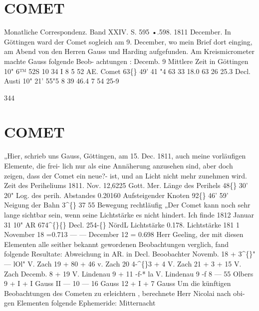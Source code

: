 \documentclass[12pt,a4paper]{article}
\newcommand{\degree}{\textdegree}
\begin{document}
\section*{COMET}
Monatliche  Correspondenz.     Band  XXIV.  S.  595  •.598.     1811  December. 
In  Göttingen  ward  der  Comet  sogleich  am  9.  December,  wo  mein  Brief  dort  einging,  am  Abend 
von  den  Herren  Gauss  und  Harding  aufgefunden.  Am  Kreismicrometer  machte  Gauss  folgende  Beob- 
achtungen : 
Decemb.   9 
Mittlere  Zeit 
in  Göttingen 
10"    6™  52S 
10    34      I 
8      5     52 
AE.  Comet 
63\degree\{\}  49'  41  "4 
63  33  18.0 
63    26    25.3 
Decl.  Austi 
10"  21'  55"5 
8  39  46.4 
7     54     25-9 


\newpage
344 

\section*{COMET}
„Hier,  schrieb  uns  Gauss,  Göttingen,  am  15.  Dec.  1811,  auch  meine  vorläufigen  Elemente,  die  frei- 
lich nur  als  eine  Annäherung  anzusehen  sind,  aber  doch  zeigen,  dass  der  Comet  ein  neue?-  ist,  und  an 
Licht  nicht  mehr  zunehmen  wird. 
Zeit  des  Periheliums  1811.  Nov.  12,6225  Gott.  Mer. 
Länge  des  Perihels   
48\degree\{\}  30'  20" 
Log.  des  perih.  Abstandes   
0.20160 
Aufsteigender  Knoten   
92\degree\{\}  46'   59' 
Neigung  der  Bahn   
3\textasciicircum\{\}    37    55 
Bewegung  rechtläufig 
„Der  Comet  kann  noch  sehr  lange  sichtbar  sein,    wenn   seine  Lichtstärke   es  nicht  hindert.     Ich 
finde  1812  Januar  31  10"  AR  674\textasciicircum\{\}\degree\{\}  Decl.  254-\degree\{\}  NördL  Lichtstärke  0.178. 
Lichtstärke  181 1  November  18     =0.713 
---  ---     December  12     =  0.698 
Herr  Geeling,  der  mit  diesen  Elementen  alle  seither  bekannt  gewordenen  Beobachtungen  verglich, 
fand  folgende  Resultate: 
Abweichung 
in  AR. 
in  Decl. 
Beoobachter 
Novemb.  18 
+  3\textasciicircum\{\}" 
---  lOl" 
V.  Zach 
19 
+  80 
+    46 
v.  Zach 
20 
4-\textasciicircum\{\}3 
+     4 
V.  Zach 
21 
+    3 
+    15 
V.  Zach 
Decemb.     8 
+  19 
V.  Lindenau 
9 
+  11 
-f-*    la 
V.  Lindenau 
9 
-f    8 
---    55 
Olbers 
9 
+    I 
+      I 
Gauss 
II 
---  10 
---    16 
Gauss 
12 
+    I 
+      7 
Gauss 
Um  die  künftigen  Beobachtungen  des  Cometen  zu  erleichtern ,  berechnete  Herr  Nicolai  nach  obi- 
gen Elementen  folgende  Ephemeride: 
Mitternacht 
\end{document}
